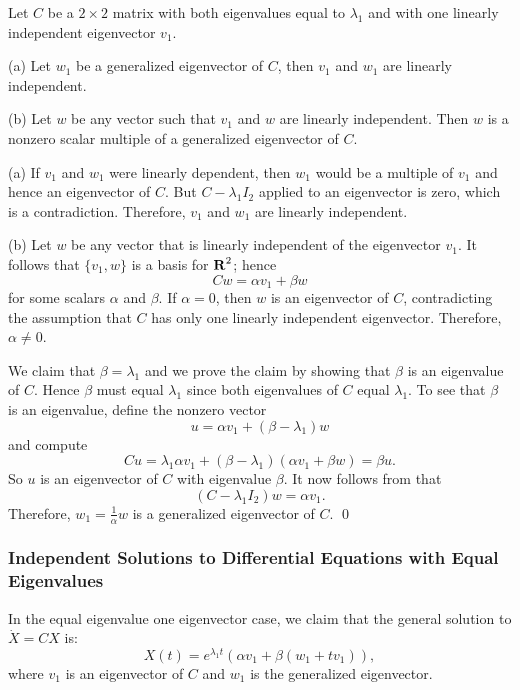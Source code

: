 \begin{lemma}  \label{L:geneig2}
Let $C$ be a $2\times 2$ matrix with both eigenvalues equal to $\lambda_1$
and with one linearly independent eigenvector $v_1$.  

\noindent (a)  Let $w_1$ be a generalized eigenvector of $C$, then $v_1$ and 
$w_1$ are linearly independent. 

\noindent (b)  Let $w$ be any vector such that $v_1$ and $w$ are linearly 
independent.  Then $w$ is a nonzero scalar multiple of a generalized 
eigenvector of $C$.
\end{lemma}

\proof  (a) If $v_1$ and $w_1$ were linearly dependent, then $w_1$ would be 
a multiple of $v_1$ and hence an eigenvector of $C$.  But $C-\lambda_1I_2$
applied to an eigenvector is zero, which is a contradiction.  Therefore, 
$v_1$ and $w_1$ are linearly independent.

(b) Let $w$ be any vector that is linearly independent of
the eigenvector $v_1$.  It follows that  $\{v_1,w\}$ is a basis for
$\mbox{$\bf{R}$}^2$; hence
\begin{equation} \label{E:Cw1}
Cw = \alpha v_1 + \beta w
\end{equation}
for some scalars $\alpha$ and $\beta$.    If $\alpha=0$, then
$w$ is an eigenvector of $C$, contradicting the assumption that $C$ has
only one linearly independent eigenvector.  Therefore, $\alpha\neq 0$.

We claim that $\beta=\lambda_1$ and we prove the claim by showing that
$\beta$ is an eigenvalue of $C$.  Hence $\beta$ must equal $\lambda_1$
since both eigenvalues of $C$ equal $\lambda_1$.  To see that $\beta$
is an eigenvalue, define the nonzero vector
\[
u = \alpha v_1 +(\beta-\lambda_1)w
\]
and compute
\[
Cu = \lambda_1 \alpha v_1 + (\beta-\lambda_1)(\alpha v_1+\beta w) =
\beta u.
\]
So $u$ is an eigenvector of $C$ with eigenvalue $\beta$.
It now follows from  that
\[
(C-\lambda_1I_2)w = \alpha v_1.
\]
Therefore, $w_1=\frac{1}{\alpha}w$ is a generalized eigenvector
of $C$.  \qed



\subsubsection*{Independent Solutions to Differential Equations with
Equal Eigenvalues}

In the equal eigenvalue one eigenvector case, we
claim that the general solution to $\dot{X}=CX$ is:
\begin{equation}  \label{e:exp1eva}
X(t) = e^{\lambda_1 t}\left(\alpha v_1 +\beta (w_1+tv_1)\right),
\end{equation}
where $v_1$ is an eigenvector of $C$ and $w_1$ is the generalized
eigenvector.

